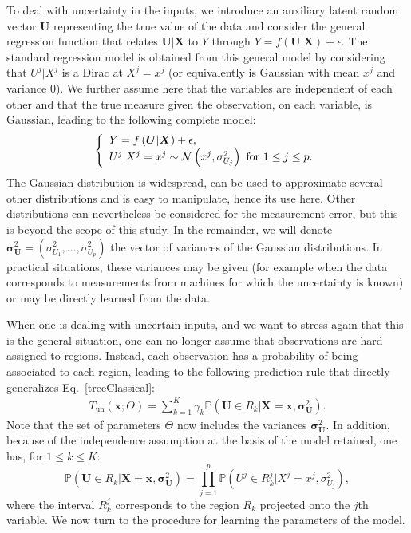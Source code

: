To deal with uncertainty in the inputs, we introduce an auxiliary latent random vector $\boldsymbol{U}$ representing the true value of the data and consider the general regression function that relates $\boldsymbol{U}|\boldsymbol{X}$ to $Y$ through $Y=f\left(\boldsymbol{U}|\boldsymbol{X}\right)+\epsilon$. The standard regression model is obtained from this general model by considering that $U^j | X^j$ is a Dirac at $X^j=x^j$ (or equivalently is Gaussian with mean $x^j$ and variance $0$). We further assume here that the variables are independent of each other and that the true measure given the observation, on each variable, is Gaussian, leading to the following complete model:
%
\begin{equation}
\left\{
\begin{array}{l}
Y=f\left(\boldsymbol{U}|\boldsymbol{X}\right)+\epsilon, \\
U^j | X^j=x^j \sim {\cal N} \left(x^j, \sigma_{U_j}^2\right) \text{ for } 1\leq j \leq p.
\end{array}
\right.
\label{model}
\end{equation}
%
The Gaussian distribution is widespread, can be used to approximate several other distributions and is easy to manipulate, hence its use here. Other distributions can nevertheless be considered for the measurement error, but this is beyond the scope of this study. In the remainder, we will denote $\boldsymbol{\sigma}_{\boldsymbol{U}}^2 = ({\sigma}_{U_1}^2, \ldots, {\sigma}_{U_p}^2)$ the vector of variances of the Gaussian distributions. In practical situations, these variances may be given (for example when the data corresponds to measurements from machines for which the uncertainty is known) or may be directly learned from the data. 

When one is dealing with uncertain inputs, and we want to stress again that this is the general situation, one can no longer assume that observations are hard assigned to regions. Instead, each observation has a probability of being associated to each region, leading to the following prediction rule that directly generalizes Eq.~\eqref{treeClassical}:
%
\begin{align}
    T_{\text{un}}\left(\boldsymbol{x}; \Theta\right) = \sum_{k=1}^K \gamma_k \mathbb{P}( \boldsymbol{U}\in R_k | \boldsymbol{X} =  \boldsymbol{x}, \boldsymbol{\sigma}_{\boldsymbol{U}}^2).
    \label{treeUncertainty}
\end{align}
%
Note that the set of parameters $\Theta$ now includes the variances $\boldsymbol{\sigma}_{\boldsymbol{U}}^2$. In addition, because of the independence assumption at the basis of the model retained, one has, for $1\leq k\leq K$:
%
\begin{equation}
\mathbb{P}(\boldsymbol{U}\in R_k | \boldsymbol{X} =  \boldsymbol{x}, \boldsymbol{\sigma}_{\boldsymbol{U}}^2) = \prod_{j=1}^{p} \mathbb{P}(U^j \in R_{k}^j| X^j = x^j,\sigma_{U_j}^2), \nonumber
\end{equation}
%
where the interval $R_k^j$ corresponds to the region  $R_k$ projected onto the $j$th variable. We now turn to the procedure for learning the parameters of the model.

